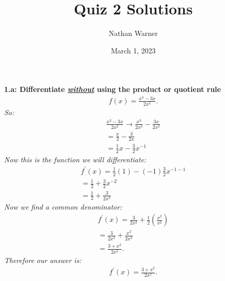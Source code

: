 \documentclass{report}
\title{\Huge{Quiz 2 Solutions}}
\author{\huge{Nathan Warner}}
\date{\huge{March 1, 2023}}
\begin{document}
    \maketitle
    \noindent
    \begin{mdframed}
        \textbf{1.a: Differentiate \textbf{\textit{\underline{without}}} using the product or quotient rule}
        \begin{align*}
            f(x) = \frac{x^{3}-3x}{2x^{2}}
        .\end{align*}
    \bigbreak \noindent 
    \bigbreak \noindent
    \textit{So:}
    \begin{align*}
        \frac{x^{3}- 3x}{2x^{2}} \longrightarrow \frac{x^{3}}{2x^{2}} - \frac{3x}{2x^{2}} \\
        = \frac{x}{2} - \frac{3}{2x} \\ 
        = \frac{1}{2}x - \frac{3}{2}x^{-1}
    \end{align*}
    \bigbreak \noindent
    \textit{Now this is the function we will differentiate:}
    \begin{align*}
        f^{\prime}(x) = \frac{1}{2}(1) - (-1)\frac{3}{2}x^{-1-1}  \\
        = \frac{1}{2} + \frac{3}{2}x^{-2} \\
        = \frac{1}{2}+\frac{3}{2x^{2}}
    \end{align*}
    \textit{Now we find a common denominator:} 
    \begin{align*}
        f^{\prime}(x) = \frac{3}{2x^{2}} + \frac{1}{2}(\frac{x^{2}}{x^{2}}) \\
        =\frac{3}{2x^{2}} + \frac{x^{2}}{2x^{2}} \\
        = \frac{3+x^{2}}{2x^{2}}
    .\end{align*}
    \bigbreak \noindent 
    \textit{Therefore our answer is:}
    \begin{align*}
      \boxed{f^{\prime}(x) = \frac{3+x^{2}}{2x^{2}}}
    .\end{align*}
    \end{mdframed}
\end{document}
